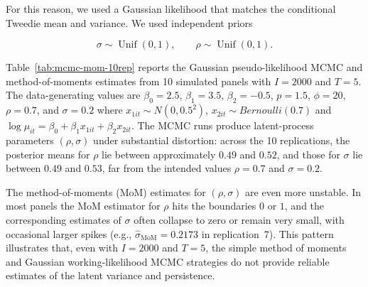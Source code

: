 \documentclass{sfuthesis}
\numberwithin{equation}{chapter}
\begin{document}
For this reason, we used a Gaussian likelihood that matches the conditional Tweedie mean and variance. 
We used independent priors

\[
\sigma \sim \operatorname{Unif}(0,1),
\qquad
\rho \sim \operatorname{Unif}(0,1).
\]


Table~\ref{tab:mcmc-mom-10rep} reports the Gaussian pseudo-likelihood MCMC and method-of-moments estimates from 10 simulated panels with \(I = 2000\) and \(T = 5\). The data-generating values are \(\beta_0 = 2.5\), \(\beta_1 = 3.5\), \(\beta_2 = -0.5\), \(p = 1.5\), \(\phi = 20\), \(\rho = 0.7\), and \(\sigma = 0.2\) where $x_{1it} \sim N(0,0.5^2) $, $x_{2it} \sim {Bernoulli}(0.7)$ and $\log\mu_{it} = \beta_0 + \beta_1x_{1it}+ \beta_2x_{2it}$. The MCMC runs produce 
latent-process parameters \((\rho,\sigma)\) under substantial distortion: across the 10 replications, the posterior means for \(\rho\) lie between approximately \(0.49\) and \(0.52\), and those for \(\sigma\) lie between \(0.49\) and \(0.53\), far from the intended values \(\rho = 0.7\) and \(\sigma = 0.2\).

The method-of-moments (MoM) estimates for \((\rho,\sigma)\) are even more unstable. In most panels the MoM estimator for \(\rho\) hits the boundaries \(0\) or \(1\), and the corresponding estimates of \(\sigma\) often collapse to zero or remain very small, with occasional larger spikes (e.g., \(\widehat{\sigma}_{\mathrm{MoM}} = 0.2173\) in replication~7). This pattern illustrates that, even with \(I = 2000\) and \(T = 5\), the simple method of moments and Gaussian working-likelihood MCMC strategies do not provide reliable estimates of the latent variance and persistence.
\end{document}
